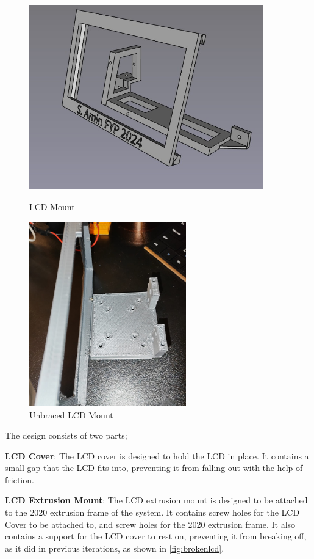 \begin{figure}[ht]
    \begin{minipage}{0.6\textwidth}
        \centering
        \includegraphics[height=8cm]{imgs/freecad/lcd_mount2.jpg}
        \caption{LCD Mount}
    \end{minipage}
    \hfill
    \begin{minipage}{0.4\textwidth}
        \centering
        \includegraphics[height=8cm]{imgs/design/unbracedscreen.jpeg}
        \caption{Unbraced LCD Mount}
        \label{fig:brokenlcd}
    \end{minipage}
\end{figure}

The design consists of two parts;
\begin{mylist}
    \item \textbf{LCD Cover}: The LCD cover is designed to hold the LCD in place. It contains a small gap that the LCD fits into, preventing it from falling out with the help of friction.
    \item \textbf{LCD Extrusion Mount}: The LCD extrusion mount is designed to be attached to the 2020 extrusion frame of the system. It contains screw holes for the LCD Cover to be attached to, and screw holes for the 2020 extrusion frame. It also contains a support for the LCD cover to rest on, preventing it from breaking off, as it did in previous iterations, as shown in \autoref{fig:brokenlcd}.
\end{mylist}


